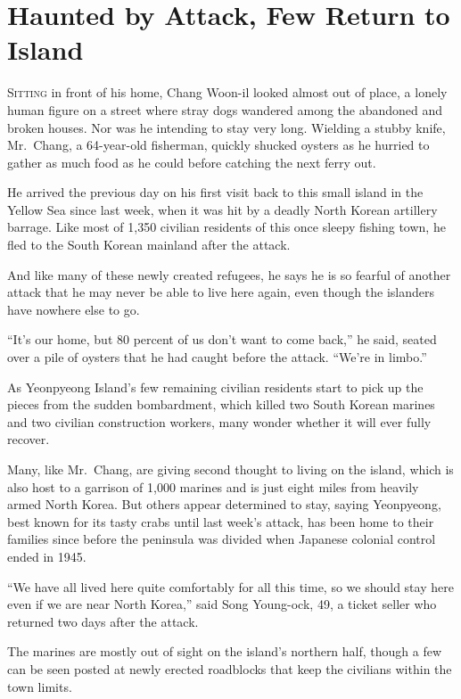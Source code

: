 ﻿\documentclass[12pt]{article}
\begin{document}
\section{Haunted by Attack, Few Return to Island}

\lettrine{S}{itting} in front of his home, Chang Woon-il looked almost out
of place, a lonely human figure on a street where stray dogs wandered among the abandoned and broken
houses. Nor was he intending to stay very long. Wielding a stubby knife, Mr.~Chang, a 64-year-old
fisherman, quickly shucked oysters as he hurried to gather as much food as he could before catching
the next ferry out.

He arrived the previous day on his first visit back to this small island in the Yellow Sea since
last week, when it was hit by a deadly North Korean artillery barrage. Like most of 1,350 civilian
residents of this once sleepy fishing town, he fled to the South Korean mainland after the attack.

And like many of these newly created refugees, he says he is so fearful of another attack that he
may never be able to live here again, even though the islanders have nowhere else to go.

``It's our home, but 80 percent of us don't want to come back,'' he said, seated over a pile of
oysters that he had caught before the attack. ``We're in limbo.''

As Yeonpyeong Island's few remaining civilian residents start to pick up the pieces from the sudden
bombardment, which killed two South Korean marines and two civilian construction workers, many
wonder whether it will ever fully recover.

Many, like Mr.~Chang, are giving second thought to living on the island, which is also host to a
garrison of 1,000 marines and is just eight miles from heavily armed North Korea. But others appear
determined to stay, saying Yeonpyeong, best known for its tasty crabs until last week's attack, has
been home to their families since before the peninsula was divided when Japanese colonial control
ended in 1945.

``We have all lived here quite comfortably for all this time, so we should stay here even if we are
near North Korea,'' said Song Young-ock, 49, a ticket seller who returned two days after the attack.

The marines are mostly out of sight on the island's northern half, though a few can be seen posted
at newly erected roadblocks that keep the civilians within the town limits.
\end{document}
